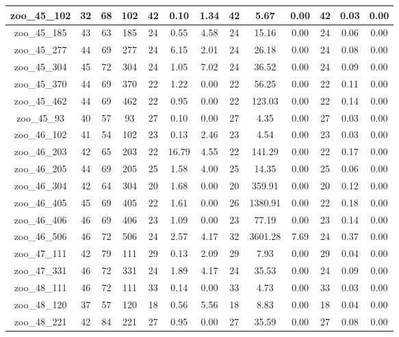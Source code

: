 \begin{landscape}
\begin{longtable}{|c|c|c|c|c|c|c|c|c|c|c|c|c|}
zoo\_45\_102 & 32 & 68 & 102 & 42 & 0.10 & 1.34 & 42 & 5.67 & 0.00 & 42 & 0.03 & 0.00 \\ \hline 
zoo\_45\_185 & 43 & 63 & 185 & 24 & 0.55 & 4.58 & 24 & 15.16 & 0.00 & 24 & 0.06 & 0.00 \\ \hline 
zoo\_45\_277 & 44 & 69 & 277 & 24 & 6.15 & 2.01 & 24 & 26.18 & 0.00 & 24 & 0.08 & 0.00 \\ \hline 
zoo\_45\_304 & 45 & 72 & 304 & 24 & 1.05 & 7.02 & 24 & 36.52 & 0.00 & 24 & 0.09 & 0.00 \\ \hline 
zoo\_45\_370 & 44 & 69 & 370 & 22 & 1.22 & 0.00 & 22 & 56.25 & 0.00 & 22 & 0.11 & 0.00 \\ \hline 
zoo\_45\_462 & 44 & 69 & 462 & 22 & 0.95 & 0.00 & 22 & 123.03 & 0.00 & 22 & 0.14 & 0.00 \\ \hline 
zoo\_45\_93 & 40 & 57 & 93 & 27 & 0.10 & 0.00 & 27 & 4.35 & 0.00 & 27 & 0.03 & 0.00 \\ \hline 
zoo\_46\_102 & 41 & 54 & 102 & 23 & 0.13 & 2.46 & 23 & 4.54 & 0.00 & 23 & 0.03 & 0.00 \\ \hline 
zoo\_46\_203 & 42 & 65 & 203 & 22 & 16.79 & 4.55 & 22 & 141.29 & 0.00 & 22 & 0.17 & 0.00 \\ \hline 
zoo\_46\_205 & 44 & 69 & 205 & 25 & 1.58 & 4.00 & 25 & 14.35 & 0.00 & 25 & 0.06 & 0.00 \\ \hline 
zoo\_46\_304 & 42 & 64 & 304 & 20 & 1.68 & 0.00 & 20 & 359.91 & 0.00 & 20 & 0.12 & 0.00 \\ \hline 
zoo\_46\_405 & 45 & 69 & 405 & 22 & 1.61 & 0.00 & 26 & 1380.91 & 0.00 & 22 & 0.18 & 0.00 \\ \hline 
zoo\_46\_406 & 46 & 69 & 406 & 23 & 1.09 & 0.00 & 23 & 77.19 & 0.00 & 23 & 0.14 & 0.00 \\ \hline 
zoo\_46\_506 & 46 & 72 & 506 & 24 & 2.57 & 4.17 & 32 & 3601.28 & 7.69 & 24 & 0.37 & 0.00 \\ \hline 
zoo\_47\_111 & 42 & 79 & 111 & 29 & 0.13 & 2.09 & 29 & 7.93 & 0.00 & 29 & 0.04 & 0.00 \\ \hline 
zoo\_47\_331 & 46 & 72 & 331 & 24 & 1.89 & 4.17 & 24 & 35.53 & 0.00 & 24 & 0.09 & 0.00 \\ \hline 
zoo\_48\_111 & 46 & 72 & 111 & 33 & 0.14 & 0.00 & 33 & 4.73 & 0.00 & 33 & 0.03 & 0.00 \\ \hline 
zoo\_48\_120 & 37 & 57 & 120 & 18 & 0.56 & 5.56 & 18 & 8.83 & 0.00 & 18 & 0.04 & 0.00 \\ \hline 
zoo\_48\_221 & 42 & 84 & 221 & 27 & 0.95 & 0.00 & 27 & 35.59 & 0.00 & 27 & 0.08 & 0.00 \\ \hline 

\end{longtable}
\end{landscape}
